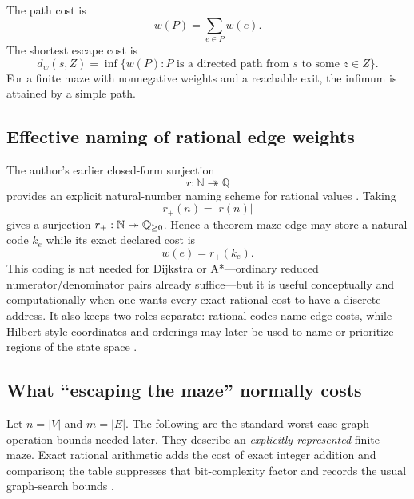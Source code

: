 The path cost is
\[
w(P)=\sum_{e\in P}w(e).
\]
The shortest escape cost is
\[
d_w(s,Z)=\inf\{w(P):P\text{ is a directed path from }s\text{ to some }z\in Z\}.
\]
For a finite maze with nonnegative weights and a reachable exit, the infimum is attained by a simple path.

\subsection{Effective naming of rational edge weights}
The author's earlier closed-form surjection
\[
r:\mathbb N\twoheadrightarrow\mathbb Q
\]
provides an explicit natural-number naming scheme for rational values \cite{rationalcoding}. Taking
\[
r_+(n)=|r(n)|
\]
gives a surjection $r_+:\mathbb N\twoheadrightarrow\mathbb{Q}_{\ge 0}$. Hence a theorem-maze edge may store a natural code $k_e$ while its exact declared cost is
\[
w(e)=r_+(k_e).
\]
This coding is not needed for Dijkstra or A*---ordinary reduced numerator/denominator pairs already suffice---but it is useful conceptually and computationally when one wants every exact rational cost to have a discrete address. It also keeps two roles separate: rational codes name edge costs, while Hilbert-style coordinates and orderings may later be used to name or prioritize regions of the state space \cite{hilbert}.

\subsection{What ``escaping the maze'' normally costs}
Let $n=|V|$ and $m=|E|$. The following are the standard worst-case graph-operation bounds needed later. They describe an \emph{explicitly represented} finite maze. Exact rational arithmetic adds the cost of exact integer addition and comparison; the table suppresses that bit-complexity factor and records the usual graph-search bounds \cite{clrs,dijkstra,astar,floyd}.

